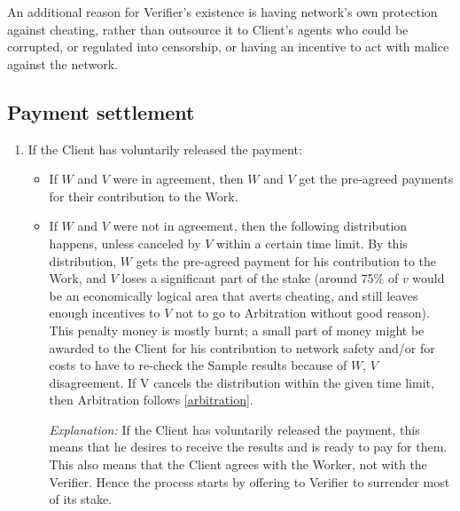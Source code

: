 \documentclass{article}
\begin{document}
An additional reason for Verifier's existence is having network's own protection against cheating, rather than outsource it to Client's agents who could be corrupted, or regulated into censorship, or having an incentive to act with malice against the network.

\subsection{Payment settlement}
\label{settlement}

\renewcommand{\labelenumi}{\arabic{enumi}.}
\begin{enumerate}
    \item If the Client has voluntarily released the payment:
        \begin{itemize}
            \item If $W$ and $V$ were in agreement, then $W$ and $V$ get the pre-agreed payments for their contribution to the Work.
            
            \item  If $W$ and $V$ were not in agreement, then the following distribution happens, unless canceled by $V$ within a certain time limit. By this distribution, $W$ gets the pre-agreed payment for his contribution to the Work, and $V$ loses a significant part of the stake (around 75\% of $v$ would be an economically logical area that averts cheating, and still leaves enough incentives to $V$ not to go to Arbitration without good reason). This penalty money is mostly burnt; a small part of money might be awarded to the Client for his contribution to network safety and/or for costs to have to re-check the Sample results because of $W$, $V$ disagreement. If V cancels the distribution within the given time limit, then Arbitration follows \ref{arbitration}.
            
            \textit{Explanation:} If the Client has voluntarily released the payment, this means that he desires to receive the results and is ready to pay for them. This also means that the Client agrees with the Worker, not with the Verifier. Hence the process starts by offering to Verifier to surrender most of its stake.
        \end{itemize}
        

\end{enumerate}
\end{document}
